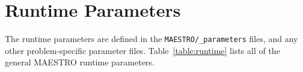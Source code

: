 
\section{Runtime Parameters}
\label{sec:runtime_parameters}

The runtime parameters are defined in the {\tt MAESTRO/\_parameters}
files, and any other problem-specific parameter files.
Table~\ref{table:runtime} lists all of the general MAESTRO runtime 
parameters.
